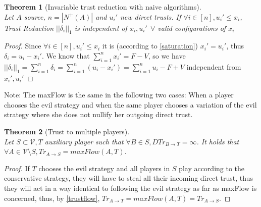 \documentclass[11pt]{article}
\newtheorem{theorem}{Theorem}[section]
\theoremstyle{definition}
\theoremstyle{corollary}
\theoremstyle{lemma}
\begin{document}
    \begin{theorem}[Invariable trust reduction with naive algorithms] \ \\
       \label{invariability}
       Let $A$ source, $n = |N^{+}(A)|$ and $u_i'$ new direct trusts. If $\forall i \in [n],u_i' \leq x_i$,
       Trust Reduction $||\delta_i||_1$ is independent of $x_i, u_i' \:\: \forall$ valid configurations of $x_i$
    \end{theorem}
    \begin{proof} 
       Since $\forall i \in [n],u_i' \leq x_i$ it is (according to \ref{saturation}) $x_i' = u_i'$, thus
       $\delta_i = u_i - x_i'$. We know that $\sum\limits_{i=1}^{n}x_i' = F - V$, so we have $||\delta_i||_1 =
       \sum\limits_{i=1}^{n}\delta_i = \sum\limits_{i=1}^{n}(u_i - x_i') = \sum\limits_{i=1}^{n}u_i - F + V$ independent
       from $x_i', u_i'$
    \end{proof}

    Note: The maxFlow is the same in the following two cases: When a player chooses the evil strategy and when the same
    player chooses a variation of the evil strategy where she does not nullify her outgoing direct trust.
    \begin{theorem}[Trust to multiple players] \ \\
       \label{trustmany}
       Let $S \subset \mathcal{V}, T$ auxiliary player such that $\forall B \in S, DTr_{B \rightarrow T} = \infty$.
       It holds that $\forall A \in \mathcal{V} \setminus S, Tr_{A \rightarrow S} = maxFlow(A, T)$.
    \end{theorem}       
    \begin{proof}
       If $T$ chooses the evil strategy and all players in $S$ play according to the conservative strategy, they will have to steal
       all their incoming direct trust, thus they will act in a way identical to following the evil strategy as far as
       maxFlow is concerned, thus, by \ref{trustflow}, $Tr_{A \rightarrow T} = maxFlow(A, T) = Tr_{A \rightarrow S}$.
    \end{proof}
\end{document}
